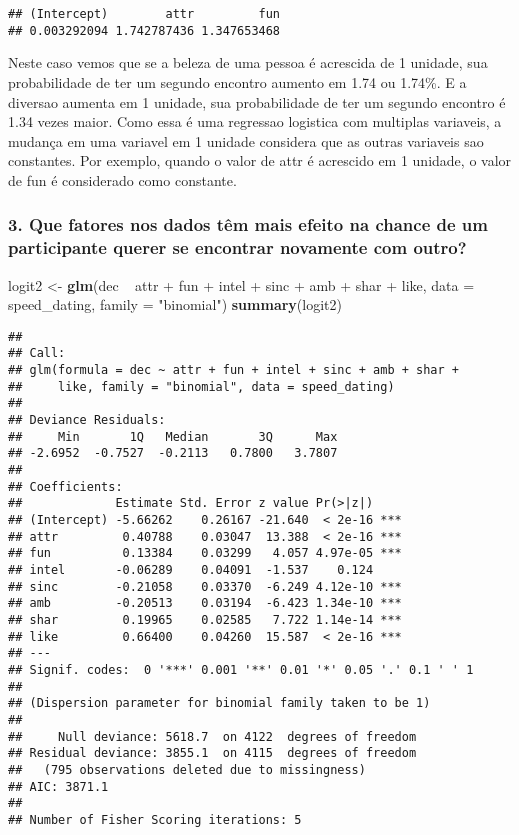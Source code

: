 \documentclass[]{article}
\newenvironment{Shaded}{\begin{snugshade}}{\end{snugshade}}
\newcommand{\KeywordTok}[1]{\textcolor[rgb]{0.13,0.29,0.53}{\textbf{{#1}}}}
\newcommand{\DataTypeTok}[1]{\textcolor[rgb]{0.13,0.29,0.53}{{#1}}}
\newcommand{\StringTok}[1]{\textcolor[rgb]{0.31,0.60,0.02}{{#1}}}
\newcommand{\NormalTok}[1]{{#1}}
\begin{document}
\begin{verbatim}
## (Intercept)        attr         fun 
## 0.003292094 1.742787436 1.347653468
\end{verbatim}

Neste caso vemos que se a beleza de uma pessoa é acrescida de 1 unidade,
sua probabilidade de ter um segundo encontro aumento em 1.74 ou 1.74\%.
E a diversao aumenta em 1 unidade, sua probabilidade de ter um segundo
encontro é 1.34 vezes maior. Como essa é uma regressao logistica com
multiplas variaveis, a mudança em uma variavel em 1 unidade considera
que as outras variaveis sao constantes. Por exemplo, quando o valor de
attr é acrescido em 1 unidade, o valor de fun é considerado como
constante.

\subsubsection{3. Que fatores nos dados têm mais efeito na chance de um
participante querer se encontrar novamente com
outro?}\label{que-fatores-nos-dados-tem-mais-efeito-na-chance-de-um-participante-querer-se-encontrar-novamente-com-outro}

\begin{Shaded}
\begin{Highlighting}[]
\NormalTok{logit2 <-}\StringTok{ }\KeywordTok{glm}\NormalTok{(dec ~}\StringTok{ }\NormalTok{attr +}\StringTok{ }\NormalTok{fun +}\StringTok{ }\NormalTok{intel +}\StringTok{ }\NormalTok{sinc +}\StringTok{ }\NormalTok{amb +}\StringTok{ }\NormalTok{shar +}\StringTok{ }\NormalTok{like, }\DataTypeTok{data =} \NormalTok{speed_dating, }\DataTypeTok{family =} \StringTok{"binomial"}\NormalTok{)}
\KeywordTok{summary}\NormalTok{(logit2)}
\end{Highlighting}
\end{Shaded}

\begin{verbatim}
## 
## Call:
## glm(formula = dec ~ attr + fun + intel + sinc + amb + shar + 
##     like, family = "binomial", data = speed_dating)
## 
## Deviance Residuals: 
##     Min       1Q   Median       3Q      Max  
## -2.6952  -0.7527  -0.2113   0.7800   3.7807  
## 
## Coefficients:
##             Estimate Std. Error z value Pr(>|z|)    
## (Intercept) -5.66262    0.26167 -21.640  < 2e-16 ***
## attr         0.40788    0.03047  13.388  < 2e-16 ***
## fun          0.13384    0.03299   4.057 4.97e-05 ***
## intel       -0.06289    0.04091  -1.537    0.124    
## sinc        -0.21058    0.03370  -6.249 4.12e-10 ***
## amb         -0.20513    0.03194  -6.423 1.34e-10 ***
## shar         0.19965    0.02585   7.722 1.14e-14 ***
## like         0.66400    0.04260  15.587  < 2e-16 ***
## ---
## Signif. codes:  0 '***' 0.001 '**' 0.01 '*' 0.05 '.' 0.1 ' ' 1
## 
## (Dispersion parameter for binomial family taken to be 1)
## 
##     Null deviance: 5618.7  on 4122  degrees of freedom
## Residual deviance: 3855.1  on 4115  degrees of freedom
##   (795 observations deleted due to missingness)
## AIC: 3871.1
## 
## Number of Fisher Scoring iterations: 5
\end{verbatim}
\end{document}
